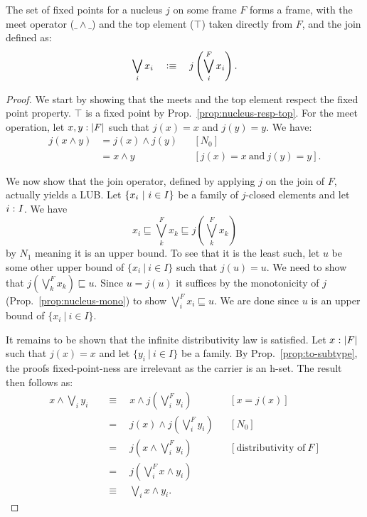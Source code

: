 \begin{thm}\label{thm:fixed-point-frame}
  The set of fixed points for a nucleus $j$ on some frame $F$ forms a frame, with the meet
  operator ($\_\wedge\_$) and the top element ($\top$) taken directly from $F$, and the join
  defined as:
  \begin{equation*}
    \bigvee_i x_i \quad\vcentcolon\equiv\quad j \left( \bigvee^F_i x_i \right).
  \end{equation*}
\end{thm}
\begin{proof}
  We start by showing that the meets and the top element respect the fixed point property.
  $\top$ is a fixed point by Prop.~\ref{prop:nucleus-resp-top}. For the meet operation, let
  $x, y:\left| F \right|$ such that $j(x) = x$ and $j(y) = y$. We have:
  \begin{align*}
    j(x \wedge y) &= j(x) \wedge j(y) && [N_0] \\
             &= x \wedge y       && [j(x) = x~\text{and}~j(y) = y].
  \end{align*}

  We now show that the join operator, defined by applying $j$ on the join of $F$, actually
  yields a LUB. Let $\left\{  x_i ~|~ i \in I  \right\}$ be a family of $j$-closed elements and let
  $i\hspace{0.1mm}:\hspace{0.1mm}I$. We have
  \begin{equation*}
    x_i \sqsubseteq \bigvee^F_k x_k \sqsubseteq j\left( \bigvee^F_k x_k \right)
  \end{equation*}
  by $N_1$ meaning it is an upper bound. To see that it is the least such, let $u$ be some
  other upper bound of $\{ x_i ~|~ i \in I \}$ such that $j(u) = u$. We need to show that $j
  \left( \bigvee^F_k x_k \right) \sqsubseteq u$. Since $u = j(u)$ it suffices by the monotonicity of $j$
  (Prop.~\ref{prop:nucleus-mono}) to show $\bigvee^F_i x_i \sqsubseteq u$. We are done since $u$ is an
  upper bound of $\{ x_i ~|~ i \in I \}$.

  It remains to be shown that the infinite distributivity law is satisfied. Let
  $x\hspace{0.1mm}:\hspace{0.1mm}\left| F \right|$ such that $j(x) = x$ and let $\{ y_i ~|~ i \in I \}$ be a family.
  By Prop.~\ref{prop:to-subtype}, the proofs fixed-point-ness are irrelevant as the
  carrier is an h-set. The result then follows as:
  \begin{align*}
    x \wedge \bigvee_i y_i
      &\quad\equiv\quad x    \wedge j\left( \bigvee^F_i y_i \right)      && [x = j(x)]                     \\
      &\quad=\quad j(x) \wedge j\left( \bigvee^F_i y_i \right)      && [N_0]                          \\
      &\quad=\quad j \left( x \wedge \bigvee^F_i y_i \right)        && [\text{distributivity of}\ F]  \\
      &\quad=\quad j \left( \bigvee^F_i x \wedge y_i \right)                                          \\
      &\quad\equiv\quad \bigvee_i x \wedge y_i                                                             .
  \end{align*}
\end{proof}

